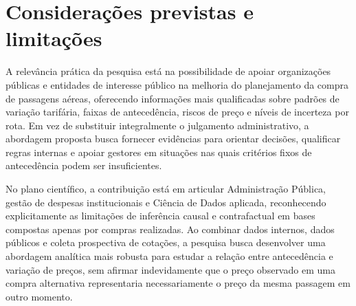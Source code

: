 \section{Considerações previstas e limitações}

A relevância prática da pesquisa está na possibilidade de apoiar organizações públicas e entidades de interesse público na melhoria do planejamento da compra de passagens aéreas, oferecendo informações mais qualificadas sobre padrões de variação tarifária, faixas de antecedência, riscos de preço e níveis de incerteza por rota. Em vez de substituir integralmente o julgamento administrativo, a abordagem proposta busca fornecer evidências para orientar decisões, qualificar regras internas e apoiar gestores em situações nas quais critérios fixos de antecedência podem ser insuficientes.

No plano científico, a contribuição está em articular Administração Pública, gestão de despesas institucionais e Ciência de Dados aplicada, reconhecendo explicitamente as limitações de inferência causal e contrafactual em bases compostas apenas por compras realizadas. Ao combinar dados internos, dados públicos e coleta prospectiva de cotações, a pesquisa busca desenvolver uma abordagem analítica mais robusta para estudar a relação entre antecedência e variação de preços, sem afirmar indevidamente que o preço observado em uma compra alternativa representaria necessariamente o preço da mesma passagem em outro momento.
